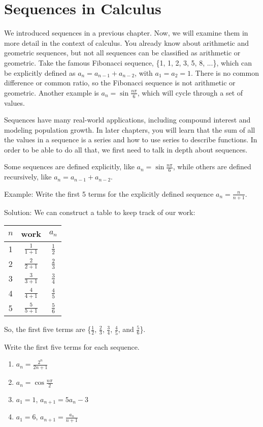 \chapter{Sequences in Calculus}

We introduced sequences in a previous chapter. Now, we will examine them 
in more detail in the context of calculus. You already know about arithmetic and 
geometric sequences, but not all sequences can be classified as arithmetic or 
geometric. Take the famous Fibonacci sequence, \{1, 1, 2, 3, 5, 8, ...\}, 
which can be explicitly defined as $a_n = a_{n-1} + a_{n-2}$, with $a_1 = a_2 
= 1$. There is no common difference or common ratio, so the Fibonacci sequence 
is not arithmetic or geometric. Another example is $a_n = \sin{\frac{n\pi}{6}}$, 
which will cycle through a set of values. 

Sequences have many real-world applications, including compound interest and 
modeling population growth. In later chapters, you will learn that the sum of 
all the values in a sequence is a series and how to use series to describe 
functions. In order to be able to do all that, we first need to talk in depth 
about sequences. 

Some sequences are defined explicitly, like $a_n = \sin{\frac{n\pi}{6}}$, while 
others are defined recursively, like $a_n = a_{n-1} + a_{n-2}$. 

Example: Write the first 5 terms for the explicitly defined sequence $a_n = 
\frac{n}{n+1}$.

Solution: We can construct a table to keep track of our work:
\begin{center}
\begin{tabular}{|c|c|c|}\hline
$n$ & work & $a_n$\\
\hline
1 & $\frac{1}{1+1}$ & $\frac{1}{2}$\\
\hline
2 & $\frac{2}{2+1}$ & $\frac{2}{3}$\\
\hline
3 & $\frac{3}{3+1}$ & $\frac{3}{4}$\\
\hline
4 & $\frac{4}{4+1}$ & $\frac{4}{5}$\\
\hline
5 & $\frac{5}{5+1}$ & $\frac{5}{6}$\\
\hline
\end{tabular}
\end{center}

So, the first five terms are \{$\frac{1}{2}$, $\frac{2}{3}$, $\frac{3}{4}$, 
$\frac{4}{5}$, and $\frac{5}{6}$\}. 

\begin{Exercise}[label = seqcalc1]
Write the first five terms for each sequence. 
\begin{enumerate}
\item $a_n = \frac{2^n}{2n+1}$
\item $a_n = \cos{\frac{n\pi}{2}}$
\item $a_1 = 1$, $a_{n+1} = 5a_n-3$
\item $a_1 = 6$, $a_{n+1} = \frac{a_n}{n+1}$
\end{enumerate}
\end{Exercise}

